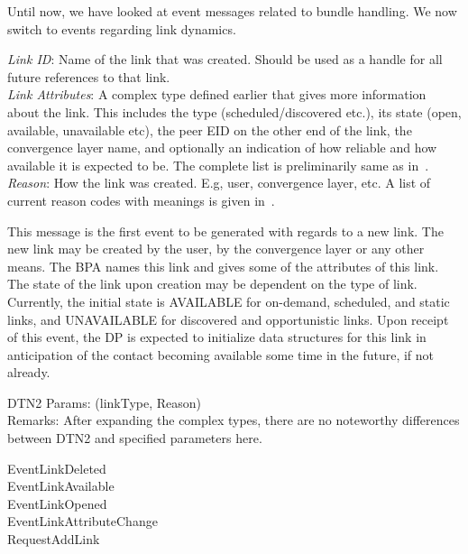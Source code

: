 Until now, we have looked at event messages related to bundle handling. We now
switch to events regarding link dynamics.

{
\metP
    {\em Link ID}: Name of  the link that was created. Should be
    used as a handle for all future references to that link.\\
    {\em Link Attributes}: A complex type defined earlier that gives
    more information about the link. This includes the type
    (scheduled/discovered etc.), its state (open, available, unavailable etc),
     the peer EID on the
    other end of the link, the convergence layer name, and optionally 
    an indication of how reliable and how available it is expected to be.
    The complete list is preliminarily same as in~\cite{MITRE-IF}.\\
    {\em Reason}: How the link was created. E.g, user, convergence layer, etc.
    A list of current reason codes with meanings is given in~\cite{MITRE-IF}.

\metD
    This message is the first event to be generated with regards to a
    new link. The new link may be created by the user, by the
    convergence layer or any other means. The BPA names this link and
    gives some of the attributes of this link. The state of the link
    upon creation may be dependent on the type of link. Currently, the
    initial state is AVAILABLE for on-demand, scheduled, and static
    links, and UNAVAILABLE for discovered and opportunistic
    links. Upon receipt of this event, the DP is expected to
    initialize data structures for this link in anticipation of the
    contact becoming available some time in the future, if not
    already.

\metM
    DTN2 Params: (linkType, Reason)\\
    Remarks: After expanding the complex types, there are no noteworthy
    differences between DTN2 and specified parameters here. 

\metR
    EventLinkDeleted\\
    EventLinkAvailable\\
    EventLinkOpened\\
    EventLinkAttributeChange\\
    RequestAddLink
}


